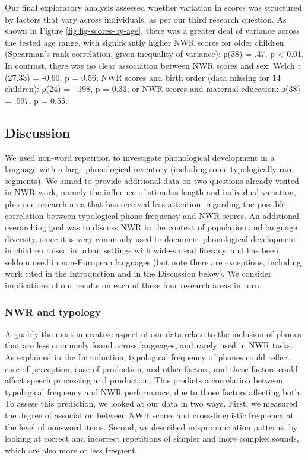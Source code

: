 \documentclass[
  american,
  ,man,floatsintext]{apa6}
\begin{document}
Our final exploratory analysis assessed whether variation in scores was structured by factors that vary across individuals, as per our third research question. As shown in Figure \ref{fig:fig-scores-by-age}, there was a greater deal of variance across the tested age range, with significantly higher NWR scores for older children (Spearman's rank correlation, given inequality of variance): ρ(38) = .47, p \textless{} 0.01. In contrast, there was no clear association between NWR scores and sex: Welch t (27.33) = -0.60, p = 0.56; NWR scores and birth order (data missing for 14 children): ρ(24) = -.198, p = 0.33; or NWR scores and maternal education: ρ(38) = .097, p = 0.55.

\hypertarget{discussion}{%
\subsection{Discussion}\label{discussion}}

We used non-word repetition to investigate phonological development in a language with a large phonological inventory (including some typologically rare segments). We aimed to provide additional data on two questions already visited in NWR work, namely the influence of stimulus length and individual variation, plus one research area that has received less attention, regarding the possible correlation between typological phone frequency and NWR scores. An additional overarching goal was to discuss NWR in the context of population and language diversity, since it is very commonly used to document phonological development in children raised in urban settings with wide-spread literacy, and has been seldom used in non-European languages (but note there are exceptions, including work cited in the Introduction and in the Discussion below). We consider implications of our results on each of these four research areas in turn.

\hypertarget{nwr-and-typology-1}{%
\subsubsection{NWR and typology}\label{nwr-and-typology-1}}

Arguably the most innovative aspect of our data relate to the inclusion of phones that are less commonly found across languages, and rarely used in NWR tasks. As explained in the Introduction, typological frequency of phones could reflect ease of perception, ease of production, and other factors, and these factors could affect speech processing and production. This predicts a correlation between typological frequency and NWR performance, due to those factors affecting both. To assess this prediction, we looked at our data in two ways. First, we measured the degree of association between NWR scores and cross-linguistic frequency at the level of non-word items. Second, we described mispronunciation patterns, by looking at correct and incorrect repetitions of simpler and more complex sounds, which are also more or less frequent.
\end{document}
